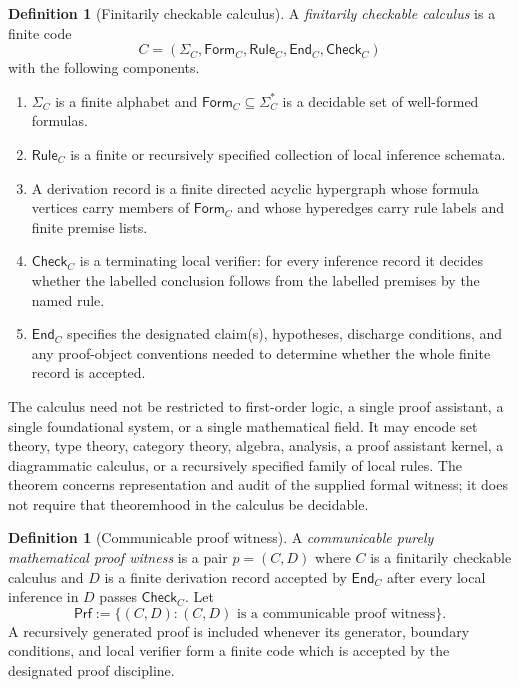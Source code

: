 \documentclass[11pt]{article}
\newcommand{\Prf}{\mathsf{Prf}}
\newcommand{\PCheck}{\mathsf{Check}}
\theoremstyle{plain}
\theoremstyle{definition}
\newtheorem{definition}[theorem]{Definition}
\theoremstyle{remark}
\begin{document}
\begin{definition}[Finitarily checkable calculus]
\label{def:calculus}
A \emph{finitarily checkable calculus} is a finite code
\[
  C=(\Sigma_C,\mathsf{Form}_C,\mathsf{Rule}_C,\mathsf{End}_C,\PCheck_C)
\]
with the following components.
\begin{enumerate}
    \item $\Sigma_C$ is a finite alphabet and $\mathsf{Form}_C\subseteq \Sigma_C^*$ is a decidable set of well-formed formulas.
    \item $\mathsf{Rule}_C$ is a finite or recursively specified collection of local inference schemata.
    \item A derivation record is a finite directed acyclic hypergraph whose formula vertices carry members of $\mathsf{Form}_C$ and whose hyperedges carry rule labels and finite premise lists.
    \item $\PCheck_C$ is a terminating local verifier: for every inference record it decides whether the labelled conclusion follows from the labelled premises by the named rule.
    \item $\mathsf{End}_C$ specifies the designated claim(s), hypotheses, discharge conditions, and any proof-object conventions needed to determine whether the whole finite record is accepted.
\end{enumerate}
\end{definition}

The calculus need not be restricted to first-order logic, a single proof assistant, a single foundational system, or a single mathematical field.  It may encode set theory, type theory, category theory, algebra, analysis, a proof assistant kernel, a diagrammatic calculus, or a recursively specified family of local rules.  The theorem concerns representation and audit of the supplied formal witness; it does not require that theoremhood in the calculus be decidable.

\begin{definition}[Communicable proof witness]
\label{def:proof}
A \emph{communicable purely mathematical proof witness} is a pair $p=(C,D)$ where $C$ is a finitarily checkable calculus and $D$ is a finite derivation record accepted by $\mathsf{End}_C$ after every local inference in $D$ passes $\PCheck_C$.  Let
\[
  \Prf := \{(C,D): (C,D) \text{ is a communicable proof witness}\}.
\]
A recursively generated proof is included whenever its generator, boundary conditions, and local verifier form a finite code which is accepted by the designated proof discipline.
\end{definition}
\end{document}
